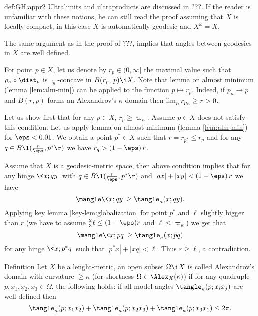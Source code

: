 {\begin{subthm}{def:GH:appr2}
Ultralimits and ultraproducts are discussed in ???. 
If the reader is unfamiliar with these notions, he can still read the proof assuming that $X$ is locally compact, in this case $X$ is automatically geodesic and $X^\omega=X$.

 The same argument as in the proof of ???, implies that angles between geodesics in $X$ are well defined.

For point $p\in X$, let us denote by $r_p\in (0,\infty]$ the maximal value such that $\rho_\kappa\circ\dist_p$ is $\comp_\kappa$-concave in $B({r_p},\,p)\i X$.
Note that lemma on almost minimum (lemma \ref{lem:alm-min}) can be applied to the function $p\mapsto r_p$.
Indeed, if $p_n\to p$ and $B(r,p)$ forms an Alexandrov's $\kappa$-domain then $\varliminf_{n}r_{p_n}\ge r>0$.

Let us show first that  for any $p\in X$,  $r_p\ge \varpi_\kappa$.
Assume $p\in X$ does not satisfy this condition.
Let us apply lemma on almost minimum (lemma \ref{lem:alm-min}) for $\eps<0.01$. 
We obtain a point $p^*\in X$ such that $r=r_{p^*}\le r_p$ and for any $q\in B\l(\tfrac{r}{\eps},p^*\r)$ we have 
$r_q> (1-\eps)\,r$. 

\smallskip

Assume that $X$ is a geodesic-metric space, then above condition implies that for any hinge $\<x;q y\>$ with $q\in B\l(\tfrac{r}{\eps},p^*\r)$ and $|q x|+|x y|< (1-\eps)\,r$ we have 
$$\mangle\<x;q y\>\ge\tangle_\kappa(x;q y).$$
Applying key lemma \ref{key-lem:globalization} 
for point $p^*$ and $\ell$ slightly bigger than $r$ (we have to assume $\tfrac23\ell\le (1-\eps)r$ 
and $\ell\le\varpi_\kappa$) we get that 
$$\mangle\<x;p q\>\ge\tangle_\kappa(x;p q)$$
for any hinge $\<x;p^* q\>$ such that $|p^*x|+|xq|<\ell$.
Thus $r\ge\ell$, a contradiction.

\smallskip










\begin{thm}{Definition}
Let $X$ be a lenght-metric, an open subset $\Omega\i X$ is called Alexandrov's domain with curvature $\ge \kappa$ (for shortness $\Omega\in\Alex_X(\kappa)$)
if for any quadruple $p,x_1,x_2,x_3\in \Omega$, the following holds:
if all model angles $\tangle_\kappa(p;x_ix_j)$ are well defined then
$$\tangle_\kappa(p;x_1x_2)+\tangle_\kappa(p;x_2x_3)+\tangle_\kappa(p;x_3x_1)\le 2\pi.$$
\end{thm}




\end{subthm}}
